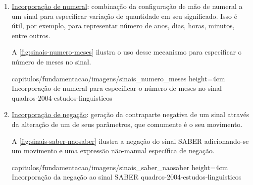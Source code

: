 \begin{enumerate}
\begin{enumerate}
              \item \underline{Incorporação de numeral}: combinação da configuração de mão de numeral a um sinal para especificar variação de quantidade em seu significado. Isso é útil, por exemplo, para representar número de anos, dias, horas, minutos, entre outros.

                    A \autoref{fig:sinais-numero-meses} ilustra o uso desse mecanismo para especificar o número de meses no sinal.


                    {capitulos/fundamentacao/imagens/sinais_numero_meses} %
                    {height=4cm} %
                    {Incorporação de numeral para especificar o número de meses no sinal} %
                    {quadros-2004-estudos-linguisticos} %



              \item \underline{Incorporação de negação}: geração da contraparte negativa de um sinal através da alteração de um de seus parâmetros, que comumente é o seu movimento.

                    A \autoref{fig:sinais-saber-naosaber} ilustra a negação do sinal SABER adicionando-se um movimento e uma expressão não-manual específica de negação.


                    {capitulos/fundamentacao/imagens/sinais_saber_naosaber} %
                    {height=4cm} %
                    {Incorporação da negação ao sinal SABER} %
                    {quadros-2004-estudos-linguisticos} %



\end{enumerate}
\end{enumerate}
